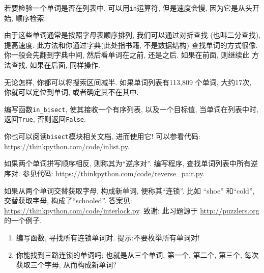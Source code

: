 \documentclass[10pt]{book}
\begin{document}
\begin{exercise}
\label{wordlist1}
\label{bisection}
若要检验一个单词是否在列表中, 可以用{\tt in}运算符, 
但是速度会慢, 因为它是从头开始, 顺序检索. 

由于这些单词通常是按照字母表顺序排列, 我们可以通过对折查找
(也叫二分查找), 提高速度. 此方法和你通过字典(此处指书籍, 不是数据结构)
查找单词的方式很像. 
你一般会先翻到字典中间, 然后看单词在之前, 还是之后. 如果在前面, 则继续此
方法查找, 如果在后面, 同样操作. 

无论怎样, 你都可以将搜索区间减半. 
如果单词列表有113,809 个单词, 大约17次, 你就可以定位到单词, 
或者确定其不在其中.

编写函数\verb"in_bisect",  使其接收一个有序列表, 以及一个目标值, 
当单词在列表中时, 返回{\tt True},  否则返回{\tt False}. 

你也可以阅读{\tt bisect}模块相关文档, 进而使用它!
可以参看代码: \url{https://thinkpython.com/code/inlist.py}.

\end{exercise}

\begin{exercise}

如果两个单词拼写顺序相反, 则称其为``逆序对''.
编写程序, 查找单词列表中所有逆序对.
参见代码: \url{https://thinkpython.com/code/reverse_pair.py}.

\end{exercise}

\begin{exercise}
如果从两个单词交替获取字母, 构成新单词, 便称其``连锁''. 
比如 ``shoe'' 和``cold'', 交替获取字母, 构成了``schooled''. 
答案见: \url{https://thinkpython.com/code/interlock.py}.
致谢: 此习题源于 \url{http://puzzlers.org} 的一个例子.

\begin{enumerate}

\item 编写函数, 寻找所有连锁单词对. 提示:不要枚举所有单词对!

\item 你能找到三路连锁的单词吗; 也就是从三个单词, 第一个, 第二个, 第三个, 
每次获取三个字母, 从而构成新单词?

\end{enumerate}
\end{exercise}
\end{document}
